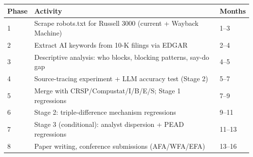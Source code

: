 \documentclass[12pt,a4paper]{article}
\begin{document}
\begin{table}[htbp]
\centering
\begin{tabular}{lll}
\toprule
\textbf{Phase} & \textbf{Activity} & \textbf{Months} \\
\midrule
1 & Scrape robots.txt for Russell 3000 (current + Wayback Machine) & 1--3 \\
2 & Extract AI keywords from 10-K filings via EDGAR & 2--4 \\
3 & Descriptive analysis: who blocks, blocking patterns, say-do gap & 4--5 \\
4 & Source-tracing experiment + LLM accuracy test (Stage 2) & 5--7 \\
5 & Merge with CRSP/Compustat/I/B/E/S; Stage 1 regressions & 7--9 \\
6 & Stage 2: triple-difference mechanism regressions & 9--11 \\
7 & Stage 3 (conditional): analyst dispersion + PEAD regressions & 11--13 \\
8 & Paper writing, conference submissions (AFA/WFA/EFA) & 13--16 \\
\bottomrule
\end{tabular}
\end{table}

\end{document}
